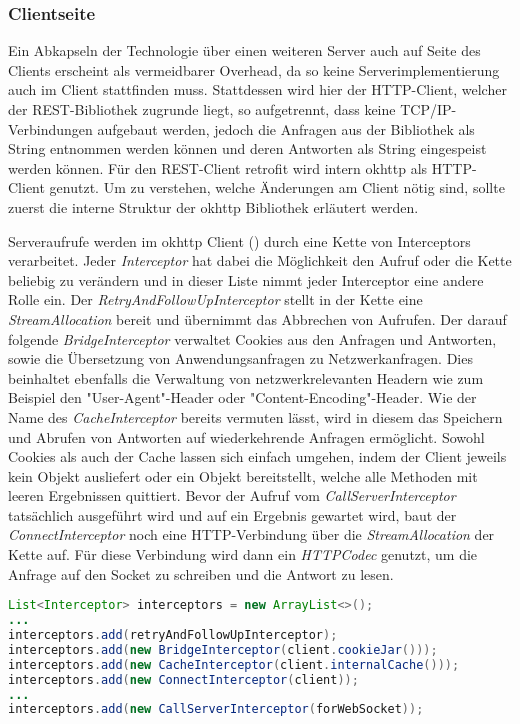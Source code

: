         \subsubsection{Clientseite}
        Ein Abkapseln der Technologie über einen weiteren Server auch auf Seite des Clients erscheint als vermeidbarer Overhead, da so keine Serverimplementierung auch im Client stattfinden muss. Stattdessen wird hier der HTTP-Client, welcher der REST-Bibliothek zugrunde liegt, so aufgetrennt, dass keine TCP/IP-Verbindungen aufgebaut werden, jedoch die Anfragen aus der Bibliothek als String entnommen werden können und  deren Antworten als String eingespeist werden können. Für den REST-Client retrofit wird intern okhttp als HTTP-Client genutzt. Um zu verstehen, welche Änderungen am Client nötig sind, sollte zuerst die interne Struktur der okhttp Bibliothek erläutert werden.
        
        Serveraufrufe werden im okhttp Client () durch eine Kette von Interceptors verarbeitet. Jeder {\it Interceptor} hat dabei die Möglichkeit den Aufruf oder die Kette beliebig zu verändern und in dieser Liste nimmt jeder Interceptor eine andere Rolle ein. Der {\it RetryAndFollowUpInterceptor} stellt in der Kette eine {\it StreamAllocation} bereit und übernimmt das Abbrechen von Aufrufen. Der darauf folgende {\it BridgeInterceptor} verwaltet Cookies aus den Anfragen und Antworten, sowie die Übersetzung von Anwendungsanfragen zu Netzwerkanfragen. Dies beinhaltet ebenfalls die Verwaltung von netzwerkrelevanten Headern wie zum Beispiel den "User-Agent"-Header oder "Content-Encoding"-Header. Wie der Name des {\it CacheInterceptor} bereits vermuten lässt, wird in diesem das Speichern und Abrufen von Antworten auf wiederkehrende Anfragen ermöglicht. Sowohl Cookies als auch der Cache lassen sich einfach umgehen, indem der Client jeweils kein Objekt ausliefert oder ein Objekt bereitstellt, welche alle Methoden mit leeren Ergebnissen quittiert. Bevor der Aufruf vom {\it CallServerInterceptor} tatsächlich ausgeführt wird und auf ein Ergebnis gewartet wird, baut der {\it ConnectInterceptor} noch eine HTTP-Verbindung über die {\it StreamAllocation} der Kette auf. Für diese Verbindung wird dann ein {\it HTTPCodec} genutzt, um die Anfrage auf den Socket zu schreiben und die Antwort zu lesen.
        
        \begin{lstlisting}[frame=bt, label={lst:android:okhttp}, language=Java, caption=Interner Aufbau von okhttp (Clientcode in Java) \cite{okhttpRealCall}]
List<Interceptor> interceptors = new ArrayList<>();
...
interceptors.add(retryAndFollowUpInterceptor);
interceptors.add(new BridgeInterceptor(client.cookieJar()));
interceptors.add(new CacheInterceptor(client.internalCache()));
interceptors.add(new ConnectInterceptor(client));
...
interceptors.add(new CallServerInterceptor(forWebSocket));
        \end{lstlisting}        
        
